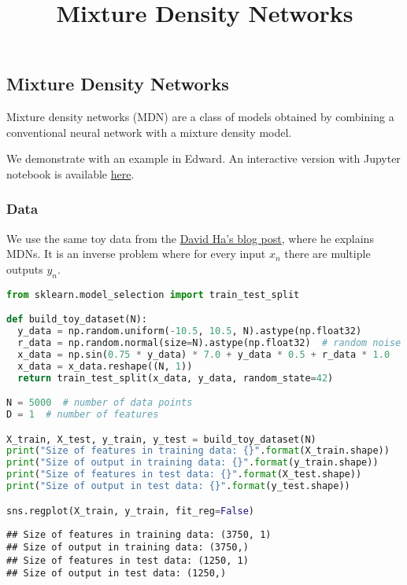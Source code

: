 \title{Mixture Density Networks}

\subsection{Mixture Density Networks}

Mixture density networks (MDN) \citep{bishop1994mixture} are a class
of models obtained by combining a conventional neural network with a
mixture density model.

We demonstrate with an example in Edward.
An interactive version with Jupyter notebook is available
\href{http://nbviewer.jupyter.org/github/blei-lab/edward/blob/master/notebooks/mixture_density_network.ipynb}{here}.

\subsubsection{Data}

We use the same toy data from the
\href{http://blog.otoro.net/2015/11/24/mixture-density-networks-with-tensorflow/}{David
Ha's blog post}, where he explains MDNs. It is an inverse problem where
for every input $x_n$ there are multiple outputs $y_n$.

\begin{lstlisting}[language=Python]
from sklearn.model_selection import train_test_split

def build_toy_dataset(N):
  y_data = np.random.uniform(-10.5, 10.5, N).astype(np.float32)
  r_data = np.random.normal(size=N).astype(np.float32)  # random noise
  x_data = np.sin(0.75 * y_data) * 7.0 + y_data * 0.5 + r_data * 1.0
  x_data = x_data.reshape((N, 1))
  return train_test_split(x_data, y_data, random_state=42)

N = 5000  # number of data points
D = 1  # number of features

X_train, X_test, y_train, y_test = build_toy_dataset(N)
print("Size of features in training data: {}".format(X_train.shape))
print("Size of output in training data: {}".format(y_train.shape))
print("Size of features in test data: {}".format(X_test.shape))
print("Size of output in test data: {}".format(y_test.shape))

sns.regplot(X_train, y_train, fit_reg=False)
\end{lstlisting}

\begin{lstlisting}
## Size of features in training data: (3750, 1)
## Size of output in training data: (3750,)
## Size of features in test data: (1250, 1)
## Size of output in test data: (1250,)
\end{lstlisting}

